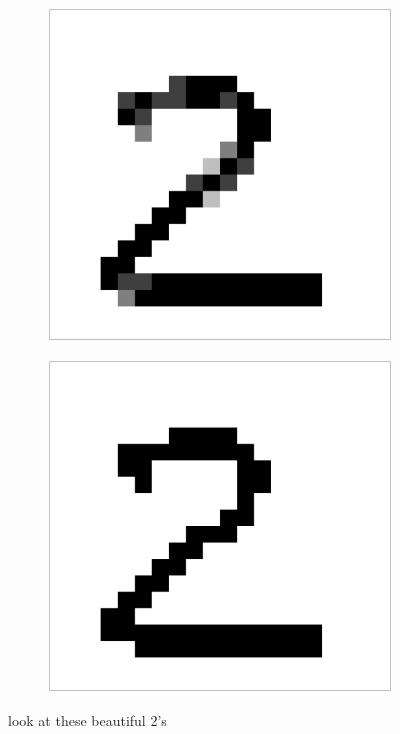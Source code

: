 \begin{figure}[h]
\begin{subfigure}{0.2\textwidth}
    \end{subfigure}
    \begin{subfigure}{0.2\textwidth}
        \includegraphics[width = \textwidth]{graphics/bins_5}
    \end{subfigure}
    \begin{subfigure}{0.2\textwidth}
        \includegraphics[width = \textwidth]{graphics/bins_2}
    \end{subfigure}
\caption{look at these beautiful 2's}
\end{figure}

